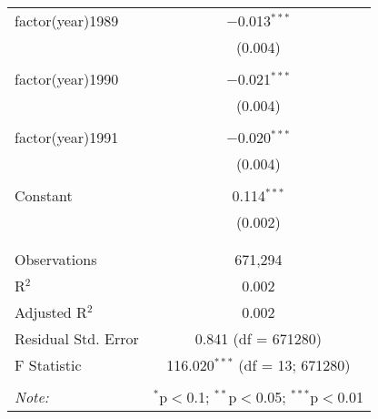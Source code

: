 \begin{table}[!htbp]
\begin{tabular}{@{\extracolsep{5pt}}lc}
 factor(year)1989 & $-$0.013$^{***}$ \\ 
  & (0.004) \\ 
  & \\ 
 factor(year)1990 & $-$0.021$^{***}$ \\ 
  & (0.004) \\ 
  & \\ 
 factor(year)1991 & $-$0.020$^{***}$ \\ 
  & (0.004) \\ 
  & \\ 
 Constant & 0.114$^{***}$ \\ 
  & (0.002) \\ 
  & \\ 
\hline \\[-1.8ex] 
Observations & 671,294 \\ 
R$^{2}$ & 0.002 \\ 
Adjusted R$^{2}$ & 0.002 \\ 
Residual Std. Error & 0.841 (df = 671280) \\ 
F Statistic & 116.020$^{***}$ (df = 13; 671280) \\ 
\hline 
\hline \\[-1.8ex] 
\textit{Note:}  & \multicolumn{1}{r}{$^{*}$p$<$0.1; $^{**}$p$<$0.05; $^{***}$p$<$0.01} \\ 
\end{tabular} 
\end{table} 
